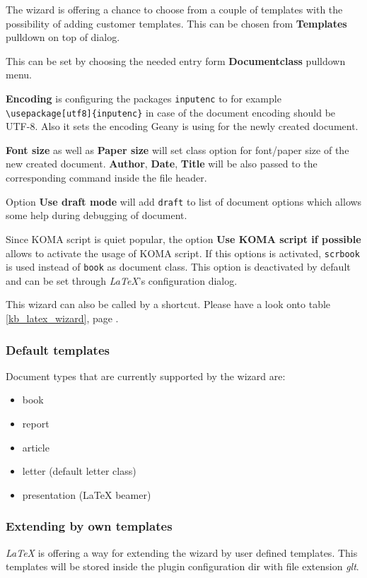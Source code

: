 \documentclass[%
paper=a4,%
fontsize=11pt,%
twoside=false,%
DIV18,%
headsepline,%
plainheadsepline,%
footsepline,%
plainfootsepline,%
bibliography=totoc,%
listof=totoc,%
BCOR10mm,%
parskip=half,%
openany,%
]{scrreprt}
\begin{document}
The wizard is offering a chance to choose from a couple of templates
with the possibility of adding customer templates. This can be
chosen from \textbf{Templates} pulldown on top of dialog.

This can be set by choosing the needed entry form
\textbf{Documentclass} pulldown menu.

\textbf{Encoding} is configuring the packages \texttt{inputenc} to
for example \texttt{\textbackslash usepackage[utf8]\{inputenc\}} in
case of the document encoding should be UTF-8. Also it sets the
encoding Geany is using for the newly created document.

\textbf{Font size} as well as \textbf{Paper size} will set class option
for font/paper size of the new created document. \textbf{Author},
\textbf{Date}, \textbf{Title} will be also passed to the corresponding
command inside the file header.

Option \textbf{Use draft mode} will add \texttt{draft} to list of
document options which allows some help during debugging of document.

Since KOMA script is quiet popular, the option \textbf{Use KOMA script
if possible} allows to activate the usage of KOMA script. If this
options is activated, \texttt{scrbook} is used instead of \texttt{book}
as document class. This option is deactivated by default and can be set
through \textit{LaTeX}'s configuration dialog.

This wizard can also be called by a shortcut. Please have a look onto
table \ref{kb_latex_wizard}, page \pageref{kb_latex_wizard}.

\subsubsection{Default templates}
Document types that are currently supported by the wizard are:
\begin{itemize}
    \item book
    \item report
    \item article
    \item letter (default letter class)
    \item presentation (\LaTeX{} beamer)
\end{itemize}

\subsubsection{Extending by own templates}
\label{sec:extending_wizard_by_own_templates}
\textit{LaTeX} is offering a way for extending the wizard by user
defined templates. This templates will be stored inside the plugin
configuration dir with file extension \textit{glt}.
\end{document}

